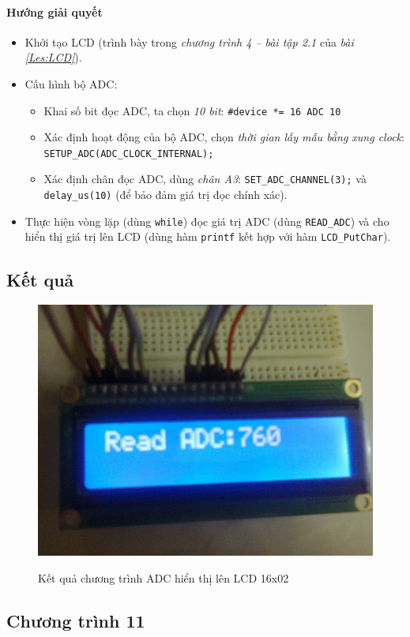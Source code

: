 \paragraph{Hướng giải quyết}
\begin{itemize}
\item Khởi tạo LCD (trình bày trong \emph{chương trình 4 -- bài tập 2.1} của \emph{bài \ref{Les:LCD}}).
\item Cấu hình bộ ADC:
\begin{itemize}
\item Khai số bit đọc ADC, ta chọn \emph{10 bit}: \verb|#device *= 16 ADC 10|
\item Xác định hoạt động của bộ ADC, chọn \emph{thời gian lấy mẫu bằng xung clock}: \verb|SETUP_ADC(ADC_CLOCK_INTERNAL);|
\item Xác định chân đọc ADC, dùng \emph{chân A3}: \verb|SET_ADC_CHANNEL(3);| và \verb|delay_us(10)| (để bảo đảm giá trị đọc chính xác).
\end{itemize}
\item Thực hiện vòng lặp (dùng \verb|while|) đọc giá trị ADC (dùng \verb|READ_ADC|) và cho hiển thị giá trị lên LCD (dùng hàm \verb|printf| kết hợp với hàm \verb|LCD_PutChar|).
\end{itemize}
\newpage
\subsection*{Kết quả}
\begin{figure}[!h]
\vspace{-.5cm}
\begin{center}
  {\includegraphics[width=.5\linewidth]{bai-4/image/4-1}}
\end{center}
\caption{Kết quả chương trình ADC hiển thị lên LCD 16x02}
\end{figure}
\subsection*{Chương trình 11}

